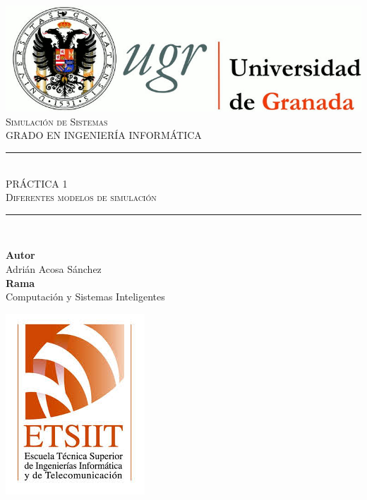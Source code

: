 \documentclass[11pt,a4paper]{report}
\newcommand{\asignatura}{Simulación de Sistemas}
\newcommand{\autor}{Adrián Acosa Sánchez}
\newcommand{\titulo}{PRÁCTICA 1}
\newcommand{\subtitulo}{Diferentes modelos de simulación}
\newcommand{\rama}{Computación y Sistemas Inteligentes}
\begin{document}

\begin{titlepage}

\begin{minipage}{\textwidth}

\centering

\includegraphics[scale=0.3]{img/logo_ugr.jpg}\\[1cm]

\textsc{\Large \asignatura{}\\[0.2cm]}
\textsc{GRADO EN INGENIERÍA INFORMÁTICA}\\[1cm]

\noindent\rule[-1ex]{\textwidth}{1pt}\\[1.5ex]
\textsc{{\Huge \titulo\\[0.5ex]}}
\textsc{{\Large \subtitulo\\}}
\noindent\rule[-1ex]{\textwidth}{2pt}\\[3.5ex]

\end{minipage}

\vspace{0.7cm}

\begin{minipage}{\textwidth}

\centering

\textbf{Autor}\\ {\autor{}}\\[2.5ex]
\textbf{Rama}\\ {\rama}\\[2.5ex]
\vspace{0.3cm}

\includegraphics[scale=0.3]{img/etsiit.jpeg}


\end{minipage}
\end{titlepage}
\end{document}
